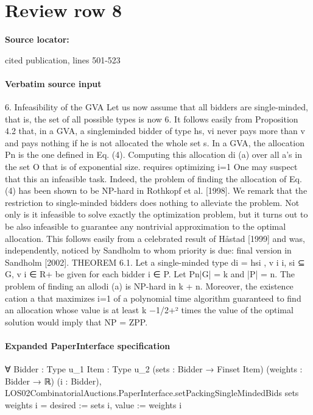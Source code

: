 \documentclass[10pt]{article}
\begin{document}
\section*{Review row 8}
\textbf{Source locator:} {\footnotesize\raggedright cited publication, lines 501-\allowbreak{}523\par}
\paragraph{Verbatim source input}
\begin{ReviewVerbatim}
6. Infeasibility of the GVA
Let us now assume that all bidders are single-minded, that is, the set of all possible
types is now 6. It follows easily from Proposition 4.2 that, in a GVA, a singleminded bidder of type hs, vi never pays more than v and pays nothing if he is not
allocated the whole set s.
In a GVA, the allocation
Pn is the one defined in Eq. (4). Computing this allocation
di (a) over all a’s in the set O that is of exponential size.
requires optimizing i=1
One may suspect that this an infeasible task. Indeed, the problem of finding the
allocation of Eq. (4) has been shown to be NP-hard in Rothkopf et al. [1998]. We
remark that the restriction to single-minded bidders does nothing to alleviate the
problem. Not only is it infeasible to solve exactly the optimization problem, but
it turns out to be also infeasible to guarantee any nontrivial approximation to the
optimal allocation. This follows easily from a celebrated result of Håstad [1999]
and was, independently, noticed by Sandholm to whom priority is due: final version
in Sandholm [2002].
THEOREM 6.1. Let a single-minded type di = hsi , v i i, si ⊆ G, v i ∈ R+ be given
for each bidder i ∈ P. Let
Pn|G| = k and |P| = n. The problem of finding an allodi (a) is NP-hard in k + n. Moreover, the existence
cation a that maximizes i=1
of a polynomial time algorithm guaranteed to find an allocation whose value is at
least k −1/2+² times the value of the optimal solution would imply that NP = ZPP.
\end{ReviewVerbatim}


\paragraph{Expanded PaperInterface specification}
\begin{ReviewVerbatim}
∀ {Bidder : Type u_1} {Item : Type u_2} (sets : Bidder → Finset Item) (weights : Bidder → ℝ) (i : Bidder),
  LOS02CombinatorialAuctions.PaperInterface.setPackingSingleMindedBids sets weights i =
    { desired := sets i, value := weights i }
\end{ReviewVerbatim}
\end{document}
